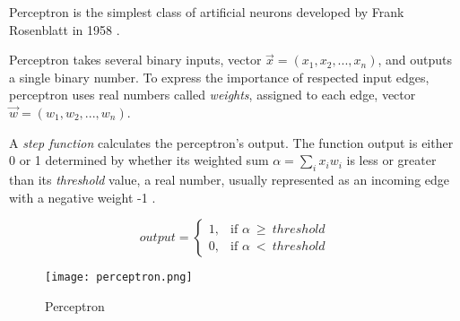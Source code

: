 Perceptron is the simplest class of artificial neurons developed by Frank Rosenblatt in 1958 \cite{perceptronprobabmodel}.

Perceptron takes several binary inputs, vector $\vec{x} = (x_1, x_2,...,x_n)$, and outputs a single binary number. To express the importance of respected input edges, perceptron uses real numbers called \textit{weights}, assigned to each edge, vector $\vec{w} = (w_1,w_2,...,w_n)$.

A \textit{step function} calculates the perceptron's output.
The function output is either 0 or 1 determined by whether its weighted sum $\alpha = \sum_{i} x_i w_i$ is less or greater than its \textit{threshold} value, a real number, usually represented as an incoming edge with a negative weight -1 \cite{matous}.

\begin{equation}
    output =
\begin{cases}
    1, & \text{if $\alpha\ \geq\ threshold$}\\
    0, & \text{if $\alpha\ <\ threshold$}
\end{cases} 
\end{equation} 


\begin{figure}[h]
	\centering
    \texttt{[image: perceptron.png]}
	\caption{Perceptron \cite{matous}}
	\label{fig:perceptron}
\end{figure}
